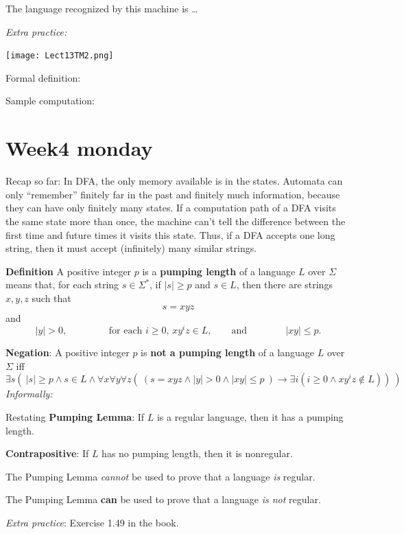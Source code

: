 \documentclass[12pt, oneside]{article}
\begin{document}
\vfill

The language recognized by this machine is \ldots

{\it Extra practice:}

 \texttt{[image: Lect13TM2.png]} 


 Formal definition: 


 Sample computation: 
  \vfill
\section*{Week4 monday}


Recap so far: In DFA, the only memory available is in the states. Automata can only
``remember'' finitely far in the past and finitely much information, because
they can have only finitely many states. If a computation path of a DFA visits 
the same state more than once, the machine can't tell the difference between 
the first time and future times it visits this state. Thus, if 
a DFA accepts one long string, then it must accept (infinitely) many 
similar strings.

{\bf Definition}  A positive integer $p$ is a {\bf pumping length} of a language $L$ over $\Sigma$ means
that, for each string $s  \in  \Sigma^*$, if  $|s| \geq p$ and $s \in L$, then there are strings $x,y,z$
such that 
\[
s = xyz
\]
and  
\[
|y| > 0,  \qquad \qquad 
\text{ for each $i \geq 0$, $xy^i z \in L$}, \qquad \text{and}
\qquad  \qquad
|xy| \leq p.
\]

{\bf Negation}: A positive integer  $p$  is {\bf not a pumping length} of a language  $L$ over  $\Sigma$  iff
\[
\exists s \left(~  |s| \geq  p \wedge s \in L \wedge \forall x \forall y \forall z  \left( ~\left( s = xyz \wedge 
|y| > 0 \wedge |xy| \leq p~ \right) \to \exists i  (  i \geq 0  \wedge xy^iz  \notin L ) \right) ~\right) 
\]
{\it Informally: }


Restating {\bf Pumping Lemma}: If $L$ is a regular language, then it  has
a pumping length.


{\bf Contrapositive}: If $L$ has no pumping length, then  it is nonregular.

\vfill

{\Large The Pumping Lemma {\it cannot} be used to prove that a language {\it is} regular.} 

{\Large The Pumping Lemma {\bf can} be used to prove that a language {\it is not} regular.}

{\it Extra practice}: Exercise 1.49 in the book.


\vfill
\end{document}
